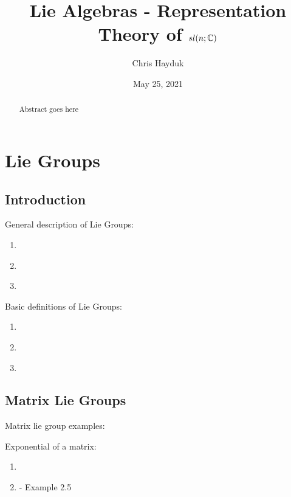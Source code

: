 \documentclass[11pt, a4paper, oneside]{article}
\theoremstyle{plain}
\theoremstyle{definition}
\theoremstyle{example}
\begin{document}
\title{Lie Algebras - Representation Theory of $sl(n; \mathbb{C})$}
\author{Chris Hayduk}
\date{May 25, 2021}
\maketitle

\begin{abstract}
Abstract goes here
\end{abstract}

\newpage
\section{Lie Groups}

\subsection{Introduction}

General description of Lie Groups: 
\begin{enumerate}
\item \cite{liegroupwiki}

\item \cite[Section 1.1]{stillwell}

\item \cite[Section 1.6]{stillwell}
\end{enumerate}

Basic definitions of Lie Groups:
\begin{enumerate}
\item \cite{liegroupwiki}

\item \cite[Section 1.1]{hall}

\item \cite[Section 1.5]{hall}
\end{enumerate}

\subsection{Matrix Lie Groups}

Matrix lie group examples: \cite[Section 1.2]{hall} 

Exponential of a matrix:
\begin{enumerate}
\item \cite[Section 2.1]{hall}

\item \cite[Section 2.2]{hall} - Example 2.5

\end{enumerate} 
\end{document}
